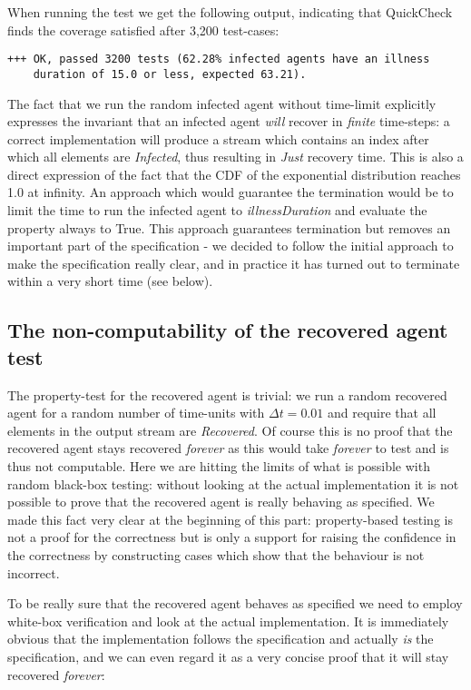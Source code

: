 When running the test we get the following output, indicating that QuickCheck finds the coverage satisfied after 3,200 test-cases:

\begin{verbatim}
+++ OK, passed 3200 tests (62.28% infected agents have an illness 
    duration of 15.0 or less, expected 63.21).
\end{verbatim}

The fact that we run the random infected agent without time-limit explicitly expresses the invariant that an infected agent \textit{will} recover in \textit{finite} time-steps: a correct implementation will produce a stream which contains an index after which all elements are \textit{Infected}, thus resulting in \textit{Just} recovery time. This is also a direct expression of the fact that the CDF of the exponential distribution reaches 1.0 at infinity. An approach which would guarantee the termination would be to limit the time to run the infected agent to \textit{illnessDuration} and evaluate the property always to True. This approach guarantees termination but removes an important part of the specification - we decided to follow the initial approach to make the specification really clear, and in practice it has turned out to terminate within a very short time (see below).

\subsection{The non-computability of the recovered agent test}
The property-test for the recovered agent is trivial: we run a random recovered agent for a random number of time-units with $\Delta t = 0.01$ and require that all elements in the output stream are \textit{Recovered}. Of course this is no proof that the recovered agent stays recovered \textit{forever} as this would take \textit{forever} to test and is thus not computable.  Here we are hitting the limits of what is possible with random black-box testing: without looking at the actual implementation it is not possible to prove that the recovered agent is really behaving as specified. We made this fact very clear at the beginning of this part: property-based testing is not a proof for the correctness but is only a support for raising the confidence in the correctness by constructing cases which show that the behaviour is not incorrect.

To be really sure that the recovered agent behaves as specified we need to employ white-box verification and look at the actual implementation. It is immediately obvious that the implementation follows the specification and actually \textit{is} the specification, and we can even regard it as a very concise proof that it will stay recovered \textit{forever}:

